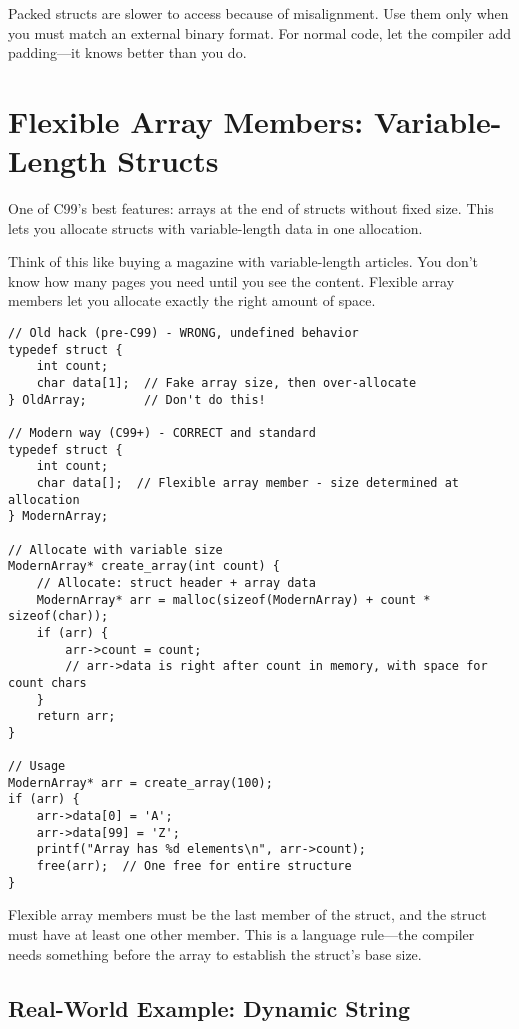 \begin{warningbox}
Packed structs are slower to access because of misalignment. Use them only when you must match an external binary format. For normal code, let the compiler add padding—it knows better than you do.
\end{warningbox}

\section{Flexible Array Members: Variable-Length Structs}

One of C99's best features: arrays at the end of structs without fixed size. This lets you allocate structs with variable-length data in one allocation.

Think of this like buying a magazine with variable-length articles. You don't know how many pages you need until you see the content. Flexible array members let you allocate exactly the right amount of space.

\begin{lstlisting}
// Old hack (pre-C99) - WRONG, undefined behavior
typedef struct {
    int count;
    char data[1];  // Fake array size, then over-allocate
} OldArray;        // Don't do this!

// Modern way (C99+) - CORRECT and standard
typedef struct {
    int count;
    char data[];  // Flexible array member - size determined at allocation
} ModernArray;

// Allocate with variable size
ModernArray* create_array(int count) {
    // Allocate: struct header + array data
    ModernArray* arr = malloc(sizeof(ModernArray) + count * sizeof(char));
    if (arr) {
        arr->count = count;
        // arr->data is right after count in memory, with space for count chars
    }
    return arr;
}

// Usage
ModernArray* arr = create_array(100);
if (arr) {
    arr->data[0] = 'A';
    arr->data[99] = 'Z';
    printf("Array has %d elements\n", arr->count);
    free(arr);  // One free for entire structure
}
\end{lstlisting}

\begin{notebox}
Flexible array members must be the last member of the struct, and the struct must have at least one other member. This is a language rule—the compiler needs something before the array to establish the struct's base size.
\end{notebox}

\subsection{Real-World Example: Dynamic String}


